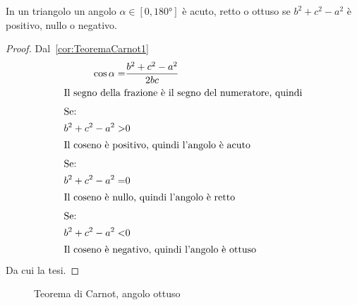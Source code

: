 \begin{cor}
	In un triangolo un angolo $\alpha\in[0,\ang{180}]$ è acuto, retto o ottuso se $b^2+c^2-a^2$ è positivo, nullo o negativo.
\end{cor}
\begin{proof}
	Dal~\cref{cor:TeoremaCarnot1} \begin{align*}
	\cos\alpha=&\dfrac{b^2+c^2-a^2}{2bc}\\
	\intertext{Il segno della frazione è il segno del numeratore, quindi}
	\intertext{Se:}
	b^2+c^2-a^2>&0\\
	\intertext{Il coseno è positivo, quindi l'angolo è acuto}
	\intertext{Se:}
	b^2+c^2-a^2=&0\\
	\intertext{Il coseno è nullo, quindi l'angolo è retto}
		\intertext{Se:}
	b^2+c^2-a^2<&0\\
	\intertext{Il coseno è negativo, quindi l'angolo è ottuso}
	\end{align*}
	Da cui la tesi.
\end{proof}
\begin{figure}
	\centering
	
	\caption{Teorema di Carnot, angolo ottuso}
	\label{fig:triangolopitagorico2}
\end{figure}